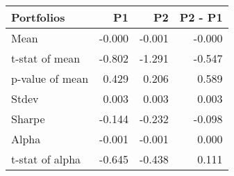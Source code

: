 \begin{tabular}{lrrr}
\toprule
Portfolios & P1 & P2 & P2 - P1 \\
\midrule
Mean & -0.000 & -0.001 & -0.000 \\
t-stat of mean & -0.802 & -1.291 & -0.547 \\
p-value of mean & 0.429 & 0.206 & 0.589 \\
Stdev & 0.003 & 0.003 & 0.003 \\
Sharpe & -0.144 & -0.232 & -0.098 \\
Alpha & -0.001 & -0.001 & 0.000 \\
t-stat of alpha & -0.645 & -0.438 & 0.111 \\
\bottomrule
\end{tabular}

